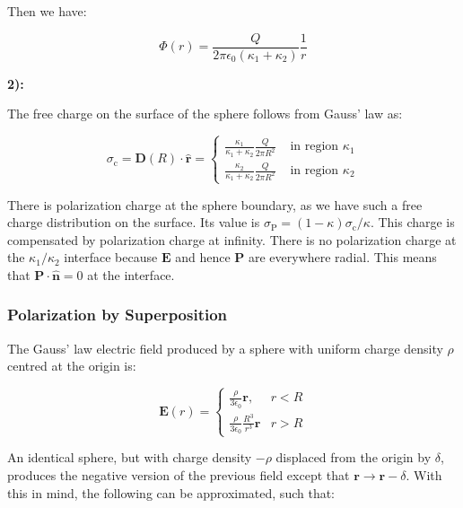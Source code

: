 Then we have:

\begin{equation}
	\Phi(r)=\frac{Q}{2 \pi \epsilon_{0}\left(\kappa_{1}+\kappa_{2}\right)} \frac{1}{r}
\end{equation}

\textbf{2):}

The free charge on the surface of the sphere follows from Gauss' law as:

\begin{equation}
	\sigma_{\mathrm{c}}=\mathbf{D}(R) \cdot \hat{\mathbf{r}}=\left\{\begin{array}{ll}
	\frac{\kappa_{1}}{\kappa_{1}+\kappa_{2}} \frac{Q}{2 \pi R^{2}} & \text { in region } \kappa_{1} \\
	\frac{\kappa_{2}}{\kappa_{1}+\kappa_{2}} \frac{Q}{2 \pi R^{2}} & \text { in region } \kappa_{2}
	\end{array}\right.
\end{equation}

There is polarization charge at the sphere boundary, as we have such a free charge distribution on the surface. Its value is $\sigma_{\mathrm{P}}=(1-\kappa) \sigma_{\mathrm{c}} / \kappa$. This charge is compensated by polarization charge at infinity. There is no polarization charge at the $\kappa_{1} / \kappa_{2}$ interface because $\mathbf{E}$ and hence $\mathbf{P}$ are everywhere radial. This means that $\mathbf{P} \cdot \hat{\mathbf{n}}=0$ at the interface.

\subsubsection{Polarization by Superposition}\label{Polarization by Superposition}


The Gauss' law electric field produced by a sphere with uniform charge density $\rho$ centred at the origin is:

\begin{equation}
	\mathbf{E}(r)=\left\{\begin{array}{ll}
		\frac{\rho}{3 \epsilon_{0}} \mathbf{r}, & r<R \\
		\frac{\rho}{3 \epsilon_{0}} \frac{R^{3}}{r^{3}} \mathbf{r} & r>R
	\end{array}\right.
\end{equation}

An identical sphere, but with charge density $-\rho$ displaced from the origin by $\delta$, produces the negative version of the previous field except that $\mathbf{r} \rightarrow \mathbf{r}-\delta$. With this in mind, the following can be approximated, such that:

